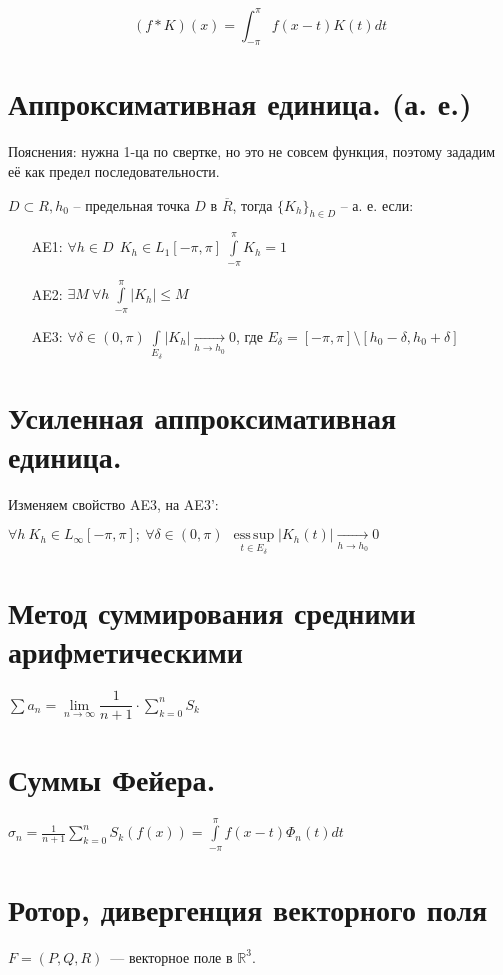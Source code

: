 \documentclass[paper=a4, fontsize=14pt]{report}
\DeclareMathOperator*{\esssup}{ess\, sup}
\begin{document}
	$$ (f \ast K)(x) = \int_{-\pi}^{\pi} f(x-t)K(t) dt$$

    \section{Аппроксимативная единица. (а. е.)}
        
        Пояснения: нужна 1-ца по свертке, но это не совсем функция, поэтому зададим её как предел последовательности.
        
        $ D \subset R, h_0 $ -- предельная точка $ D $ в $ \overline{R} $, 
        тогда $ \{K_h\}_{h \in D}$ -- а. е. если:
        \begin{itemize}
            \item[AE1: ] $ \forall h \in D ~~ K_h \in L_1[-\pi, \pi] ~ \int\limits_{-\pi}^{\pi} K_h = 1 $
            \item[AE2: ] $ \exists M ~ \forall h ~ \int\limits_{-\pi}^{\pi} |K_h| \leq M $
            \item[AE3: ] $ \forall \delta \in (0, \pi) ~  \int\limits_{E_\delta} | K_h | 
            \underset{h \rightarrow h_0}{\rightarrow} 0  $, где $E_{\delta} = [-\pi,\pi] \setminus [h_0 - \delta, h_0 + \delta]$
        \end{itemize}
        
    \section{Усиленная аппроксимативная единица.}
        
        Изменяем свойство AE3, на AE3': 
        
        $ \forall h ~ K_h \in L_\infty[-\pi, \pi]; ~ \forall \delta \in (0, \pi) ~ ~ \esssup\limits_{t \in E_\delta} |K_h(t)| \underset{h \rightarrow h_0}{\rightarrow} 0 $
        
    \section{Метод суммирования средними арифметическими}
        $\sum a_n = \lim\limits_{n \to \infty} \dfrac{1}{n+1} \cdot \sum\limits_{k=0}^n S_k$
    \section{Суммы Фейера.}
        $ \sigma_n = \frac{1}{n + 1} \sum\limits_{k=0}^{n} S_k(f(x)) = \int\limits_{-\pi}^{\pi} f(x - t) \Phi_n(t) dt$

	\section{Ротор, дивергенция векторного поля}
    $F = (P, Q, R)$~--- векторное поле в $\mathds{R}^3$.
\end{document}

